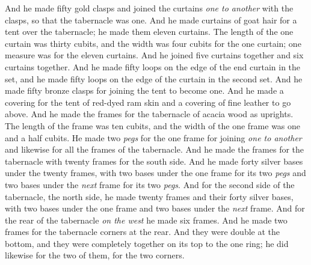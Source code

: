 \begin{biblechapter}
\verse And he made fifty gold clasps and joined the curtains \textit{one to another} with the clasps, so that the tabernacle was one.
\verse And he made curtains of goat hair for a tent over the tabernacle; he made them eleven curtains.
\verse The length of the one curtain was thirty cubits, and the width was four cubits for the one curtain; one measure was for the eleven curtains.
\verse And he joined five curtains together and six curtains together.
\verse And he made fifty loops on the edge of the end curtain in the set, and he made fifty loops on the edge of the curtain in the second set.
\verse And he made fifty bronze clasps for joining the tent to become one.
\verse And he made a covering for the tent of red-dyed ram skin and a covering of fine leather to go above.
\verse And he made the frames for the tabernacle of acacia wood as uprights.
\verse The length of the frame was ten cubits, and the width of the one frame was one and a half cubits.
\verse He made two \textit{pegs} for the one frame for joining \textit{one to another} and likewise for all the frames of the tabernacle.
\verse And he made the frames for the tabernacle with twenty frames for the south side.
\verse And he made forty silver bases under the twenty frames, with two bases under the one frame for its two \textit{pegs} and two bases under the \textit{next} frame for its two \textit{pegs}.
\verse And for the second side of the tabernacle, the north side, he made twenty frames
\verse and their forty silver bases, with two bases under the one frame and two bases under the \textit{next} frame.
\verse And for the rear of the tabernacle \textit{on the west} he made six frames.
\verse And he made two frames for the tabernacle corners at the rear.
\verse And they were double at the bottom, and they were completely together on its top to the one ring; he did likewise for the two of them, for the two corners.

\end{biblechapter}
